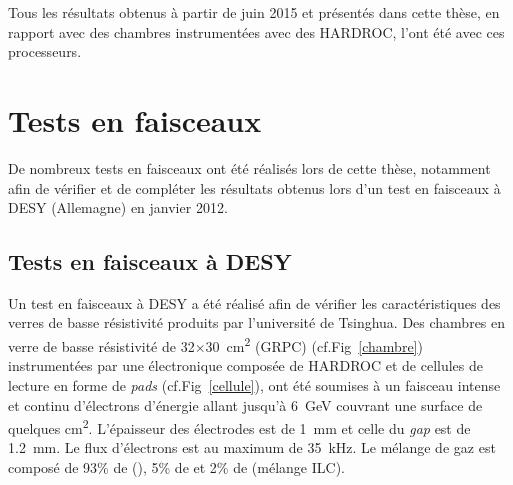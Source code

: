 \vspace*{-0.8cm}
 Tous les résultats obtenus à partir de juin \num{2015} et présentés dans cette thèse, en rapport avec des chambres instrumentées avec des HARDROC, l'ont été avec ces processeurs.
\vspace*{-0.3cm}
\section{Tests en faisceaux}
\vspace*{-0.3cm}
De nombreux tests en faisceaux ont été réalisés lors de cette thèse, notamment afin de vérifier et de compléter les résultats obtenus lors d'un test en faisceaux à DESY (Allemagne) en janvier \num{2012}.
\vspace*{-0.25cm}
\subsection{Tests en faisceaux à DESY}
\label{DESYY}
\vspace*{-0.25cm}
Un test en faisceaux à DESY \cite{Haddad:2012fx} a été réalisé afin de vérifier les caractéristiques des verres de basse résistivité produits par l'université de Tsinghua. Des chambres en verre de basse résistivité de \num{32}$\times$\SI{30}{\square\centi\meter} (GRPC) (cf.Fig~\ref{chambre}) instrumentées par une électronique composée de HARDROC et de cellules de lecture en forme de \textit{pads} (cf.Fig~\ref{cellule}), ont été soumises à un faisceau intense et continu d'électrons d'énergie allant jusqu'à \SI{6}{\giga\eV} couvrant une surface de quelques \si{\square\centi\meter}. L'épaisseur des électrodes est de \SI{1}{\milli\meter} et celle du \textit{gap} est de \SI{1.2}{\milli\meter}. Le flux d'électrons est au maximum de \SI{35}{\kilo\hertz}. Le mélange de gaz est composé de \num{93}\% de (), \num{5}\% de  et \num{2}\% de  (mélange ILC).

